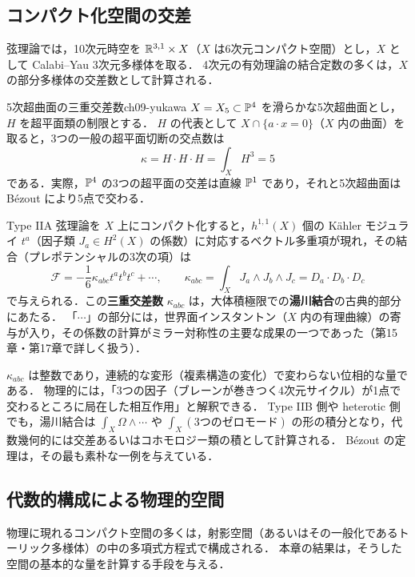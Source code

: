 \subsection{コンパクト化空間の交差}

弦理論では，10次元時空を $\mathbb{R}^{3,1}\times X$（$X$ は6次元コンパクト空間）とし，$X$ として Calabi--Yau 3次元多様体を取る．
4次元の有効理論の結合定数の多くは，$X$ の部分多様体の交差数として計算される．

\begin{myex}{5次超曲面の三重交差数}{ch09-yukawa}
$X=X_5\subset\mathbb{P}^4$ を滑らかな5次超曲面とし，$H$ を超平面類の制限とする．
$H$ の代表として $X\cap\{a\cdot x=0\}$（$X$ 内の曲面）を取ると，3つの一般の超平面切断の交点数は
\[
  \kappa=H\cdot H\cdot H=\int_XH^3=5
\]
である．実際，$\mathbb{P}^4$ の3つの超平面の交差は直線 $\mathbb{P}^1$ であり，それと5次超曲面は B\'ezout により5点で交わる．
\end{myex}

Type IIA 弦理論を $X$ 上にコンパクト化すると，$h^{1,1}(X)$ 個の Kähler モジュライ $t^a$（因子類 $J_a\in H^2(X)$ の係数）に対応するベクトル多重項が現れ，その結合（プレポテンシャルの3次の項）は
\[
  \mathcal F=-\frac16\kappa_{abc}t^at^bt^c+\cdots,\qquad \kappa_{abc}=\int_XJ_a\wedge J_b\wedge J_c=D_a\cdot D_b\cdot D_c
\]
で与えられる．この\textbf{三重交差数} $\kappa_{abc}$ は，大体積極限での\textbf{湯川結合}の古典的部分にあたる．
「$\cdots$」の部分には，世界面インスタントン（$X$ 内の有理曲線）の寄与が入り，その係数の計算がミラー対称性の主要な成果の一つであった（第15章・第17章で詳しく扱う）．

\begin{physbox}[交差数としての結合定数]
$\kappa_{abc}$ は整数であり，連続的な変形（複素構造の変化）で変わらない位相的な量である．
物理的には，「3つの因子（ブレーンが巻きつく4次元サイクル）が1点で交わるところに局在した相互作用」と解釈できる．
Type IIB 側や heterotic 側でも，湯川結合は $\int_X\Omega\wedge\cdots$ や $\int_X(\text{3つのゼロモード})$ の形の積分となり，代数幾何的には交差あるいはコホモロジー類の積として計算される．
B\'ezout の定理は，その最も素朴な一例を与えている．
\end{physbox}

\subsection{代数的構成による物理的空間}

物理に現れるコンパクト空間の多くは，射影空間（あるいはその一般化であるトーリック多様体）の中の多項式方程式で構成される．
本章の結果は，そうした空間の基本的な量を計算する手段を与える．

